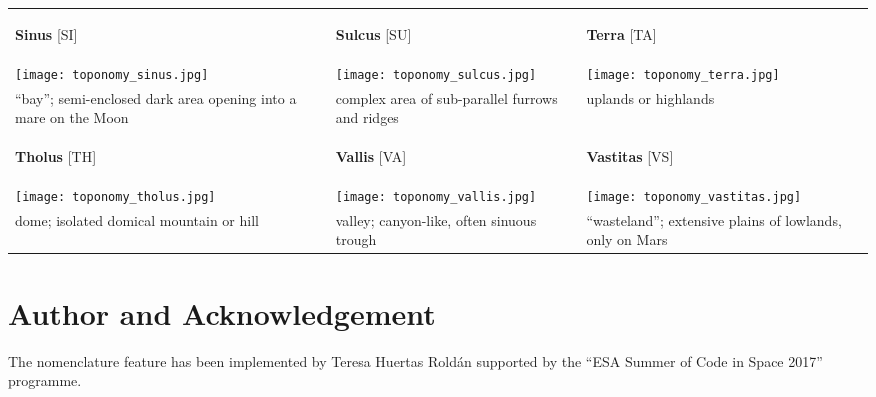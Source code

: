 \begin{longtable}{p{45mm}|p{45mm}|p{45mm}}
\begin{center}\textbf{Sinus} [SI]\end{center} & \begin{center}\textbf{Sulcus} [SU]\end{center} & \begin{center}\textbf{Terra} [TA]\end{center} \\
\texttt{[image: toponomy\_sinus.jpg]} & 
\texttt{[image: toponomy\_sulcus.jpg]} & 
\texttt{[image: toponomy\_terra.jpg]} \\
``bay''; semi-enclosed dark area opening into a mare on the Moon & complex area of sub-parallel furrows and ridges & uplands or highlands \\\midrule
\begin{center}\textbf{Tholus} [TH]\end{center} & \begin{center}\textbf{Vallis} [VA]\end{center} & \begin{center}\textbf{Vastitas} [VS]\end{center}  \\
\texttt{[image: toponomy\_tholus.jpg]} & 
\texttt{[image: toponomy\_vallis.jpg]} & 
\texttt{[image: toponomy\_vastitas.jpg]} \\
dome; isolated domical mountain or hill & valley; canyon-like, often sinuous trough & ``wasteland''; extensive plains of lowlands, only on Mars \\\bottomrule
\end{longtable}

\section*{Author and Acknowledgement}
\label{sec:Nomenclature:Acknowledgments}
The nomenclature feature has been implemented by Teresa Huertas Roldán supported by the ``ESA Summer of Code in Space 2017'' programme.


